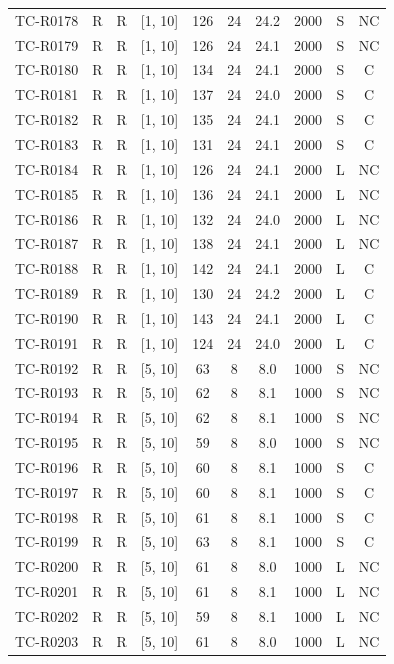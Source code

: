 \begin{longtable}{lccccccccc}
TC-R0178 & R & R & [1, 10] & 126 & 24 & 24.2 & 2000 & S & NC \\
TC-R0179 & R & R & [1, 10] & 126 & 24 & 24.1 & 2000 & S & NC \\
TC-R0180 & R & R & [1, 10] & 134 & 24 & 24.1 & 2000 & S & C \\
TC-R0181 & R & R & [1, 10] & 137 & 24 & 24.0 & 2000 & S & C \\
TC-R0182 & R & R & [1, 10] & 135 & 24 & 24.1 & 2000 & S & C \\
TC-R0183 & R & R & [1, 10] & 131 & 24 & 24.1 & 2000 & S & C \\
TC-R0184 & R & R & [1, 10] & 126 & 24 & 24.1 & 2000 & L & NC \\
TC-R0185 & R & R & [1, 10] & 136 & 24 & 24.1 & 2000 & L & NC \\
TC-R0186 & R & R & [1, 10] & 132 & 24 & 24.0 & 2000 & L & NC \\
TC-R0187 & R & R & [1, 10] & 138 & 24 & 24.1 & 2000 & L & NC \\
TC-R0188 & R & R & [1, 10] & 142 & 24 & 24.1 & 2000 & L & C \\
TC-R0189 & R & R & [1, 10] & 130 & 24 & 24.2 & 2000 & L & C \\
TC-R0190 & R & R & [1, 10] & 143 & 24 & 24.1 & 2000 & L & C \\
TC-R0191 & R & R & [1, 10] & 124 & 24 & 24.0 & 2000 & L & C \\
TC-R0192 & R & R & [5, 10] & 63 & 8 & 8.0 & 1000 & S & NC \\
TC-R0193 & R & R & [5, 10] & 62 & 8 & 8.1 & 1000 & S & NC \\
TC-R0194 & R & R & [5, 10] & 62 & 8 & 8.1 & 1000 & S & NC \\
TC-R0195 & R & R & [5, 10] & 59 & 8 & 8.0 & 1000 & S & NC \\
TC-R0196 & R & R & [5, 10] & 60 & 8 & 8.1 & 1000 & S & C \\
TC-R0197 & R & R & [5, 10] & 60 & 8 & 8.1 & 1000 & S & C \\
TC-R0198 & R & R & [5, 10] & 61 & 8 & 8.1 & 1000 & S & C \\
TC-R0199 & R & R & [5, 10] & 63 & 8 & 8.1 & 1000 & S & C \\
TC-R0200 & R & R & [5, 10] & 61 & 8 & 8.0 & 1000 & L & NC \\
TC-R0201 & R & R & [5, 10] & 61 & 8 & 8.1 & 1000 & L & NC \\
TC-R0202 & R & R & [5, 10] & 59 & 8 & 8.1 & 1000 & L & NC \\
TC-R0203 & R & R & [5, 10] & 61 & 8 & 8.0 & 1000 & L & NC \\

\end{longtable}
